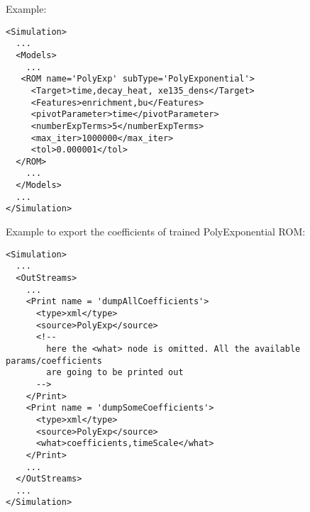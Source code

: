 \hspace{24pt}
Example:
\begin{lstlisting}[style=XML,morekeywords={name,subType}]
<Simulation>
  ...
  <Models>
    ...
   <ROM name='PolyExp' subType='PolyExponential'>
     <Target>time,decay_heat, xe135_dens</Target>
     <Features>enrichment,bu</Features>
     <pivotParameter>time</pivotParameter>
     <numberExpTerms>5</numberExpTerms>
     <max_iter>1000000</max_iter>
     <tol>0.000001</tol>
  </ROM>
    ...
  </Models>
  ...
</Simulation>
\end{lstlisting}

Example to export the coefficients of trained PolyExponential ROM:
\begin{lstlisting}[style=XML,morekeywords={name,subType}]
<Simulation>
  ...
  <OutStreams>
    ...
    <Print name = 'dumpAllCoefficients'>
      <type>xml</type>
      <source>PolyExp</source>
      <!--
        here the <what> node is omitted. All the available params/coefficients
        are going to be printed out
      -->
    </Print>
    <Print name = 'dumpSomeCoefficients'>
      <type>xml</type>
      <source>PolyExp</source>
      <what>coefficients,timeScale</what>
    </Print>
    ...
  </OutStreams>
  ...
</Simulation>
\end{lstlisting}


